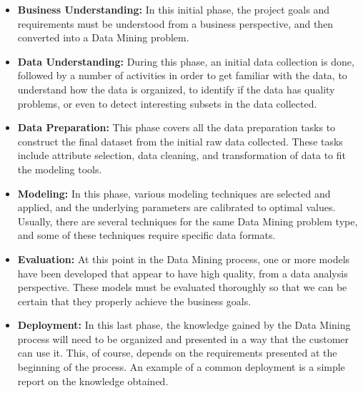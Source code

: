 \begin{itemize}
    \setlength\itemsep{1em}

    \item\textbf{Business Understanding:} In this initial phase, the project goals and requirements must be understood from a business perspective, and then converted into a Data Mining problem.

    \item\textbf{Data Understanding:} During this phase, an initial data collection is done, followed by a number of activities in order to get familiar with the data, to understand how the data is organized, to identify if the data has quality problems, or even to detect interesting subsets in the data collected.

    \item\textbf{Data Preparation:} This phase covers all the data preparation tasks to construct the final dataset from the initial raw data collected. These tasks include attribute selection, data cleaning, and transformation of data to fit the modeling tools.

    \item\textbf{Modeling:} In this phase, various modeling techniques are selected and applied, and the underlying parameters are calibrated to optimal values. Usually, there are several techniques for the same Data Mining problem type, and some of these techniques require specific data formats.

    \item\textbf{Evaluation:} At this point in the Data Mining process, one or more models have been developed that appear to have high quality, from a data analysis perspective. These models must be evaluated thoroughly so that we can be certain that they properly achieve the business goals.

    \item\textbf{Deployment:} In this last phase, the knowledge gained by the Data Mining process will need to be organized and presented in a way that the customer can use it. This, of course, depends on the requirements presented at the beginning of the process. An example of a common deployment is a simple report on the knowledge obtained. 

\end{itemize}


